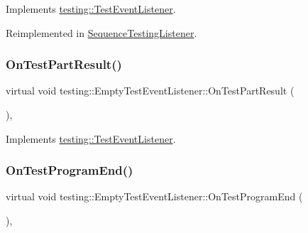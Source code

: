 Implements \mbox{\hyperlink{classtesting_1_1TestEventListener_a60cc09b7907cb329d152eb5e7133bdeb}{testing\+::\+Test\+Event\+Listener}}.



Reimplemented in \mbox{\hyperlink{classSequenceTestingListener_a345641262fa10cc4b251ac54116db74b}{Sequence\+Testing\+Listener}}.

\mbox{\label{classtesting_1_1EmptyTestEventListener_a59e7f7d9f2e2d089a6e8c1e2577f4718}} 
\subsubsection{\texorpdfstring{OnTestPartResult()}{OnTestPartResult()}}
{\footnotesize\ttfamily virtual void testing\+::\+Empty\+Test\+Event\+Listener\+::\+On\+Test\+Part\+Result (\begin{DoxyParamCaption}\item[{const Test\+Part\+Result \&}]{ }\end{DoxyParamCaption})\hspace{0.3cm}{\ttfamily [inline]}, {\ttfamily [virtual]}}



Implements \mbox{\hyperlink{classtesting_1_1TestEventListener_a054f8705c883fa120b91473aff38f2ee}{testing\+::\+Test\+Event\+Listener}}.

\mbox{\label{classtesting_1_1EmptyTestEventListener_a0abcc02bd2331a2e29ad6f4d9daf2a32}} 
\subsubsection{\texorpdfstring{OnTestProgramEnd()}{OnTestProgramEnd()}}
{\footnotesize\ttfamily virtual void testing\+::\+Empty\+Test\+Event\+Listener\+::\+On\+Test\+Program\+End (\begin{DoxyParamCaption}\item[{const \mbox{\hyperlink{classtesting_1_1UnitTest}{Unit\+Test}} \&}]{ }\end{DoxyParamCaption})\hspace{0.3cm}{\ttfamily [inline]}, {\ttfamily [virtual]}}



